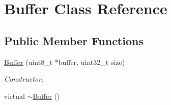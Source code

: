 \hypertarget{classBuffer}{
\section{Buffer Class Reference}
\label{classBuffer}
}
\subsection*{Public Member Functions}
\begin{DoxyCompactItemize}
\item 
\hyperlink{classBuffer_a7fa5687eb5aeee187cf30d3d89f98751}{Buffer} (uint8\_\-t $\ast$buffer, uint32\_\-t size)
\begin{DoxyCompactList}\small\item\em Constructor. \item\end{DoxyCompactList}\item 
\hypertarget{classBuffer_a59b8743e4a5f731bdd0c4185c9ef263b}{
virtual \hyperlink{classBuffer_a59b8743e4a5f731bdd0c4185c9ef263b}{$\sim$Buffer} ()}
\label{classBuffer_a59b8743e4a5f731bdd0c4185c9ef263b}


\end{DoxyCompactItemize}
